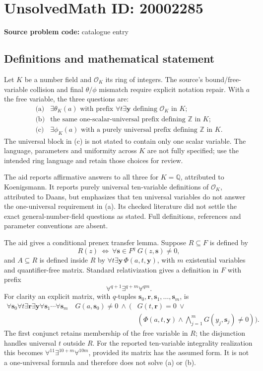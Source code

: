 \documentclass[11pt]{article}
\begin{document}
\section*{UnsolvedMath ID: 20002285}
\textbf{Source problem code:} catalogue entry
\subsection{Definitions and mathematical statement}
Let \(K\) be a number field and \(\mathcal O_K\) its ring of integers. The source's bound/free-variable collision and final \(\theta/\phi\) mismatch require explicit notation repair. With \(a\) the free variable, the three questions are:
\[
 \begin{array}{ll}
 \text{(a)}&\exists\theta_K(a)\text{ with prefix }\forall t\exists\mathbf y
 \text{ defining }\mathcal O_K\text{ in }K;\\
 \text{(b)}&\text{the same one-scalar-universal prefix defining }\mathbb Z\text{ in }K;\\
 \text{(c)}&\exists\phi_K(a)\text{ with a purely universal prefix defining }\mathbb Z\text{ in }K.
 \end{array}
\]
The universal block in (c) is not stated to contain only one scalar variable. The language, parameters and uniformity across \(K\) are not fully specified; use the intended ring language and retain those choices for review.

The aid reports affirmative answers to all three for \(K=\mathbb Q\), attributed to Koenigsmann. It reports purely universal ten-variable definitions of \(\mathcal O_K\), attributed to Daans, but emphasizes that ten universal variables do not answer the one-universal requirement in (a). Its checked literature did not settle the exact general-number-field questions as stated. Full definitions, references and parameter conventions are absent.

The aid gives a conditional prenex transfer lemma. Suppose \(R\subseteq F\) is defined by
\[
 R(z)\ \Longleftrightarrow\
 \forall\mathbf s\in F^q\;G(z,\mathbf s)\ne0,
\]
and \(A\subseteq R\) is defined inside \(R\) by
\(\forall t\exists\mathbf y\,\Phi(a,t,\mathbf y)\), with \(m\) existential variables and quantifier-free matrix. Standard relativization gives a definition in \(F\) with prefix
\[
 \forall^{q+1}\exists^{q+m}\forall^{qm}.
\]
For clarity an explicit matrix, with \(q\)-tuples \(\mathbf s_0,\mathbf r,\mathbf s_1,\ldots,\mathbf s_m\), is
\[
 \begin{split}
 \forall\mathbf s_0\forall t\exists\mathbf r\exists\mathbf y
 \forall\mathbf s_1\cdots\forall\mathbf s_m\quad
 G(a,\mathbf s_0)\ne0\ \wedge\
 \bigl(&G(t,\mathbf r)=0\ \vee\\
 &(\Phi(a,t,\mathbf y)\wedge
       \bigwedge_{j=1}^mG(y_j,\mathbf s_j)\ne0)\bigr).
 \end{split}
\]
The first conjunct retains membership of the free variable in \(R\); the disjunction handles universal \(t\) outside \(R\). For the reported ten-variable integrality realization this becomes
\(\forall^{11}\exists^{10+m}\forall^{10m}\), provided its matrix has the assumed form. It is not a one-universal formula and therefore does not solve (a) or (b).
\end{document}
